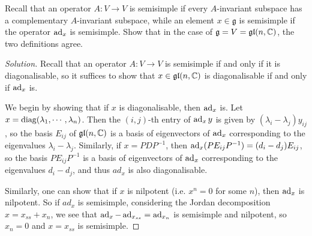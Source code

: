 \documentclass{report}
\begin{document}
\begin{exercise}[Exercise 6.2]\label{ex:semisimple_elements}
    Recall that an operator $A:V \to V$ is semisimple if every $A$-invariant subspace has a complementary $A$-invariant subspace, while an element $x \in \mathfrak g$ is semisimple if the operator $\operatorname{ad}_x$ is semisimple.
    Show that in the case of $\mathfrak g = V = \operatorname{{\mathfrak{gl}}}(n, \mathbb C)$, the two definitions agree.
\end{exercise}
\begin{proof}[Solution]
    Recall that an operator $A:V \to V$ is semisimple if and only if it is diagonalisable, so it suffices to show that $x \in \operatorname{{\mathfrak{gl}}}(n, \mathbb C)$ is diagonalisable if and only if $\operatorname{ad}_x$ is.
    
    We begin by showing that if $x$ is diagonalisable, then $\operatorname{ad}_x$ is.
    Let $x = \operatorname{diag}(\lambda_1, \cdots, \lambda_n)$.
    Then the $(i,j)$-th entry of $\operatorname{ad}_x y$ is given by $(\lambda_i - \lambda_j)y_{ij}$, so the basis $E_{ij}$ of $\operatorname{{\mathfrak{gl}}}(n, \mathbb C)$ is a basis of eigenvectors of $\operatorname{ad}_x$ corresponding to the eigenvalues $\lambda_i - \lambda_j$.
    Similarly, if $x = P D P^{-1}$, then $\operatorname{ad}_x (P E_{ij}P^{-1}) = (d_i - d_j) E_{ij}$, so the basis $P E_{ij}P^{-1}$ is a basis of eigenvectors of $\operatorname{ad}_x$ corresponding to the eigenvalues $d_i - d_j$, and thus $ad_x$ is also diagonalisable.

    Similarly, one can show that if $x$ is nilpotent (i.e. $x^n = 0$ for some $n$), then $\operatorname{ad}_x$ is nilpotent.
    So if $ad_x$ is semisimple, considering the Jordan decomposition $x = x_{ss} + x_n$, we see that $\operatorname{ad}_x - \operatorname{ad}_{x_{ss}} = \operatorname{ad}_{x_n}$ is semisimple and nilpotent, so $x_n = 0$ and $x = x_{ss}$ is semisimple.
\end{proof}
\end{document}
